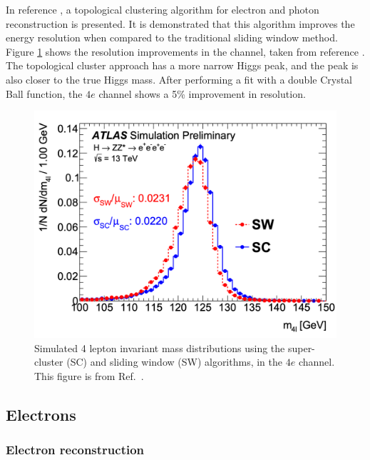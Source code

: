 In reference \cite{ATL-PHYS-PUB-2017-022}, a topological clustering algorithm for electron and photon reconstruction is presented. It is demonstrated that this algorithm improves the energy resolution when compared to the traditional sliding window method. Figure \ref{fig:H4l_topo_cluster} shows the resolution improvements in the \HFourL{} channel, taken from reference \cite{ATL-PHYS-PUB-2017-022}. The topological cluster approach has a more narrow Higgs peak, and the peak is also closer to the true Higgs mass. After performing a fit with a double Crystal Ball function, the $4e$ channel shows a 5\% improvement in resolution.
\begin{figure}
    \centering
    \includegraphics[width=\mediumfigwidth]{Figures/LHC/H4l_topo_cluster.png}
    \caption{Simulated 4 lepton invariant mass distributions using the super-cluster (SC) and sliding window (SW) algorithms, in the $4e$ channel. This figure is from Ref.~\cite{ATL-PHYS-PUB-2017-022}.}
    \label{fig:H4l_topo_cluster}
\end{figure}

\subsection{Electrons}
\label{ssec:electronreco}
\subsubsection{Electron reconstruction}

